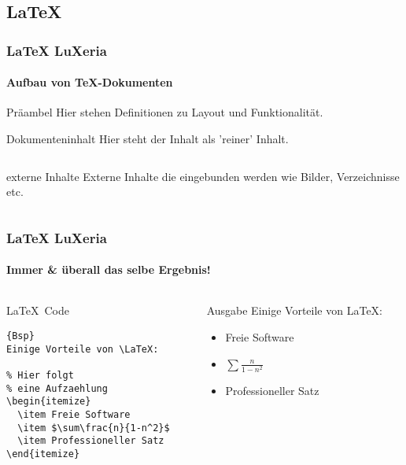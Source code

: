 \subsection{\LaTeX}
\begin{frame}[fragile]
	\frametitle{\LaTeX \hfill{} \footnotesize{LuXeria}}
	\framesubtitle{Aufbau von \TeX-Dokumenten}
	\begin{block}{Präambel}
	Hier stehen Definitionen zu Layout und Funktionalität.
	\end{block}
	\begin{block}{Dokumenteninhalt}
	Hier steht der Inhalt als 'reiner' Inhalt.
		\begin{columns}
			\begin{column}{6cm}
				\begin{alertblock}{externe Inhalte}
					Externe Inhalte die eingebunden werden wie Bilder, Verzeichnisse etc.
				\end{alertblock}
			\end{column}
		\end{columns}
	\end{block}
\end{frame}


\begin{frame}[fragile]
	\frametitle{\LaTeX \hfill{} \footnotesize{LuXeria}}
	\framesubtitle{Immer \& überall das selbe Ergebnis!}
	\begin{columns}
		\begin{column}{5cm}
			\begin{block}{\LaTeX~Code}
				
\begin{lstlisting}{Bsp}
Einige Vorteile von \LaTeX:

% Hier folgt 
% eine Aufzaehlung
\begin{itemize}
  \item Freie Software
  \item $\sum\frac{n}{1-n^2}$
  \item Professioneller Satz
\end{itemize}
\end{lstlisting}
				
			\end{block}
		\end{column}
		\begin{column}{5cm}
			\begin{block}{Ausgabe}
				Einige Vorteile von \LaTeX:
				\begin{itemize}
					\item Freie Software
					\item $\sum\frac{n}{1-n^2}$
					\item Professioneller Satz
				\end{itemize}
			\end{block}
		\end{column}
	\end{columns}
\end{frame}

